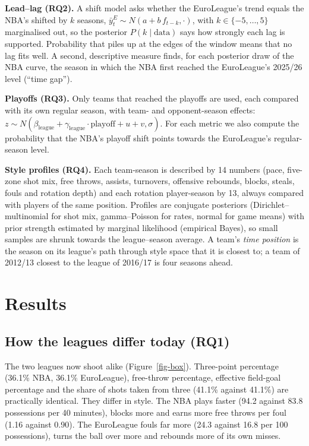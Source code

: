\documentclass[
  11pt,
  a4paper,
]{article}
\begin{document}
\textbf{Lead--lag (RQ2).} A shift model asks whether the EuroLeague's
trend equals the NBA's shifted by \(k\) seasons,
\(\bar y^{E}_t \sim N(a + b\,f_{t-k}, \cdot)\), with
\(k \in \{-5, \dots, 5\}\) marginalised out, so the posterior
\(P(k \mid \text{data})\) says how strongly each lag is supported.
Probability that piles up at the edges of the window means that no lag
fits well. A second, descriptive measure finds, for each posterior draw
of the NBA curve, the season in which the NBA first reached the
EuroLeague's 2025/26 level (``time gap'').

\textbf{Playoffs (RQ3).} Only teams that reached the playoffs are used,
each compared with its own regular season, with team- and
opponent-season effects:
\(z \sim N(\beta_{\text{league}} + \gamma_{\text{league}}\cdot\text{playoff} + u + v, \sigma)\).
For each metric we also compute the probability that the NBA's playoff
shift points towards the EuroLeague's regular-season level.

\textbf{Style profiles (RQ4).} Each team-season is described by 14
numbers (pace, five-zone shot mix, free throws, assists, turnovers,
offensive rebounds, blocks, steals, fouls and rotation depth) and each
rotation player-season by 13, always compared with players of the same
position. Profiles are conjugate posteriors (Dirichlet--multinomial for
shot mix, gamma--Poisson for rates, normal for game means) with prior
strength estimated by marginal likelihood (empirical Bayes), so small
samples are shrunk towards the league--season average. A team's
\emph{time position} is the season on its league's path through style
space that it is closest to; a team of 2012/13 closest to the league of
2016/17 is four seasons ahead.

\section{Results}\label{results}

\subsection{How the leagues differ today
(RQ1)}\label{how-the-leagues-differ-today-rq1}

The two leagues now shoot alike (Figure~\ref{fig-box}). Three-point
percentage (36.1\% NBA, 36.1\% EuroLeague), free-throw percentage,
effective field-goal percentage and the share of shots taken from three
(41.1\% against 41.1\%) are practically identical. They differ in style.
The NBA plays faster (94.2 against 83.8 possessions per 40 minutes),
blocks more and earns more free throws per foul (1.16 against 0.90). The
EuroLeague fouls far more (24.3 against 16.8 per 100 possessions), turns
the ball over more and rebounds more of its own misses.
\end{document}
